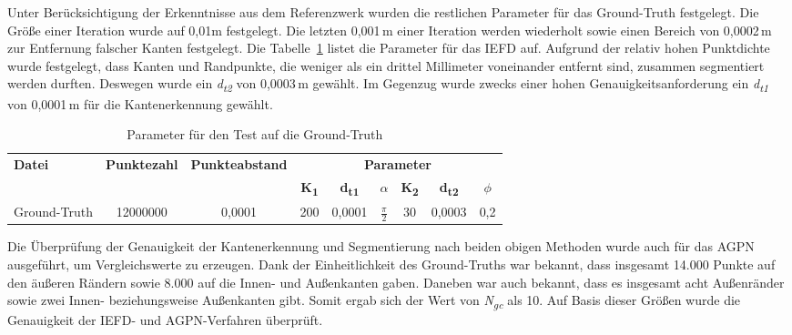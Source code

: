 Unter Berücksichtigung der Erkenntnisse aus dem Referenzwerk wurden die restlichen Parameter für das Ground-Truth festgelegt. Die Größe einer Iteration wurde auf 0,01m festgelegt. Die letzten 0,001\,\si{\m} einer Iteration werden wiederholt sowie einen Bereich von 0,0002\,\si{\m} zur Entfernung falscher Kanten festgelegt. Die Tabelle~\ref{table: parameters_test1} listet die Parameter für das IEFD auf. Aufgrund der relativ hohen Punktdichte wurde festgelegt, dass Kanten und Randpunkte, die weniger als ein drittel Millimeter voneinander entfernt sind, zusammen segmentiert werden durften. Deswegen wurde ein \textit{d\textsubscript{t2}} von 0,0003\,\si{\m} gewählt. Im Gegenzug wurde zwecks einer hohen Genauigkeitsanforderung ein \textit{d\textsubscript{t1}} von 0,0001\,\si{\m} für die Kantenerkennung gewählt.

\begin{table}
	\centering
	\begin{tabular}[width=\textwidth]{l *{8}{c}}
		\hline
		\multirow{2}{*}{\textbf{Datei}}&\multirow{2}{*}{\textbf{Punktezahl}}&\multirow{2}{*}{\textbf{Punkteabstand}}&\multicolumn{6}{c}{\textbf{Parameter}}\\
		& & & \textbf{K\textsubscript{1}} & \textbf{d\textsubscript{t1}} & \textbf{$\alpha$} & \textbf{K\textsubscript{2}} & \textbf{d\textsubscript{t2}} & \textbf{$\phi$} \\
		\hline
		Ground-Truth & 12000000 & 0,0001 & 200 & 0,0001 & $\frac{\pi}{2}$ & 30 & 0,0003 & 0,2 \\
		\hline
	\end{tabular}
	\caption[Prozessparameter für die erste Untersuchung]{Parameter für den Test auf die Ground-Truth}
	\label{table: parameters_test1}
\end{table}

Die Überprüfung der Genauigkeit der Kantenerkennung und Segmentierung nach beiden obigen Methoden wurde auch für das AGPN ausgeführt, um Vergleichswerte zu erzeugen. Dank der Einheitlichkeit des Ground-Truths war bekannt, dass insgesamt 14.000 Punkte auf den äußeren Rändern sowie 8.000 auf die Innen- und Außenkanten gaben. Daneben war auch bekannt, dass es insgesamt acht Außenränder sowie zwei Innen- beziehungsweise Außenkanten gibt. Somit ergab sich der Wert von \textit{N\textsubscript{gc}} als 10. Auf Basis dieser Größen wurde die Genauigkeit der IEFD- und AGPN-Verfahren überprüft.

